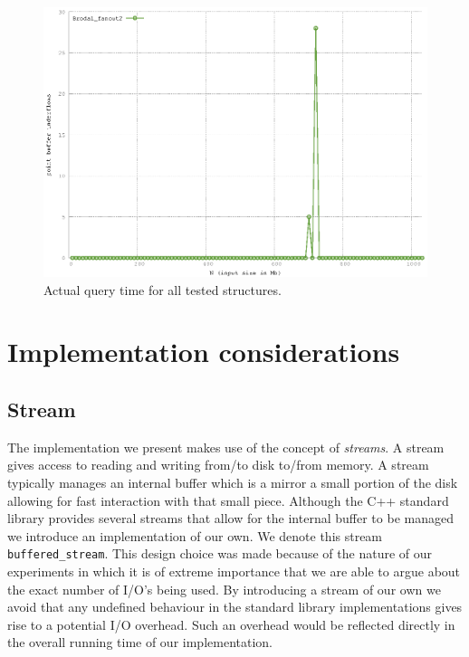\documentclass[twoside,11pt,openright]{report}
\begin{document}
\begin{figure}[htp!]
\includegraphics[width=\textwidth]{../src/experiments/query_experiment_results/final2/pbu}
\caption{Actual query time for all tested structures.}
\label{fig:result_query_search_complexity}
\end{figure}

\chapter{Implementation considerations}

\section{Stream}
The implementation we present makes use of the concept of \textit{streams}. A stream gives access to reading and writing from/to disk to/from memory. A stream typically manages an internal buffer which is a mirror a small portion of the disk allowing for fast interaction with that small piece. Although the C++ standard library provides several streams that allow for the internal buffer to be managed we introduce an implementation of our own. We denote this stream \texttt{buffered\_stream}. This design choice was made because of the nature of our experiments in which it is of extreme importance that we are able to argue about the exact number of I/O's being used. By introducing a stream of our own we avoid that any undefined behaviour in the standard library implementations gives rise to a potential I/O overhead. Such an overhead would be reflected directly in the overall running time of our implementation.
\end{document}
